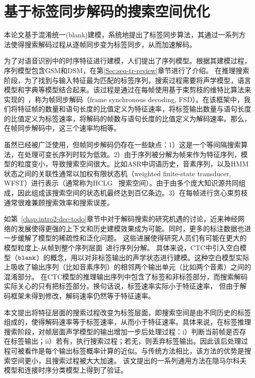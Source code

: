 
\chapter{基于标签同步解码的搜索空间优化}
\label{chap:lsd}

本论文基于混淆统一(blank)建模，系统地提出了标签同步算法，其通过一系列方法使得搜索解码过程从逐帧同步变为标签同步，从而加速解码。

为了对语音识别中的时序特征进行建模，人们提出了序列模型。根据其建模过程，序列模型包含GSM和DSM，在第\ref{Sec:seq-tr-review}章节进行了介绍。
在推理搜索阶段，为了找到与输入特征最为匹配的标签序列，搜索过程需要将声学模型，语言模型和字典等模型结合起来。该过程是通过在每帧使用基于束剪枝的维特比算法来实现的~\cite{forney1973viterbi}，称为帧同步解码（frame synchronous decoding, FSD）。在该框架中，我们将特征帧的数量和语句长度的比值定义为特征速率，将标签输出数量与语句长度的比值定义为标签速率，将解码的帧数与语句长度的比值定义为解码速率。那么，在帧同步解码中，这三个速率均相等。

虽然已经被广泛使用，但帧同步解码仍存在一些缺点：1）这是一个等间隔搜索算法，在处理可变长序列时较为低效。2）由于序列被分解为帧来作为特征序列，模型的粒度变小，导致搜索空间很大。比如ASR中词语历史，音素序列，以及HMM状态之间的关联性通常以加权有限状态机（weighted finite-state transducer, WFST）进行表示（通常称为HCLG~\cite{mohri2002weighted} 搜索空间）。由于由多个庞大知识源共同组成，因此组成该搜索空间的状态机最终达到百亿条边。3）在每帧进行贪心束剪枝通常很难兼顾搜索效率和搜索误差。

如第~\ref{chap:intro2-dec-todo}章节中对于解码搜索的研究机遇的讨论，近来神经网络的发展使得更强的上下文和历史建模效果成为可能\cite{sak2014long,qian2016very}。同时，更多的标注数据也进一步缓解了模型的稀疏性和泛化问题。
这些进展使得研究人员们有可能在更大的模型粒度上-从帧到整个序列层面~\cite{amodei2015deep,soltau2016neural,collobert2016wav2letter,sak2015fast,chan2016end}进行序列分解。
具体来说，CTC中引入空白模型（$\tt blank$）的概念，用以对非标签输出的声学状态进行建模。这种空白模型实际上吸收了输出序列（比如音素序列）的相邻两个输出单元（比如两个音素）之间的混淆部分。
在CTC模型的推理输出序列中包含了标签和非标签部分，而搜索解码实际关心的只有把标签部分。换句话说，标签速率实际小于特征速率，
但由于解码框架未得到修改，解码速率仍然等于特征速率。

本文提出将特征层面的搜索过程改变为标签层面，即搜索空间是由不同历史的标签组成的，使得解码速率等于标签速率，从而小于特征速率。具体来说，在标签推理搜索阶段，对帧层面声学模型的输出增加一步后处理过程：i）判断当前帧是否存在标签输出；ii）若有，执行搜索过程；若无，则丢弃标签输出。因此该后处理过程可被看作是每个输出标签概率计算的近似。与传统方法相比，该方法的优势是搜索空间更小，且搜索过程被大大加速。
该文提出的一系列通用方法在隐马尔科夫模型和连接时序分类模型上得到了验证。

